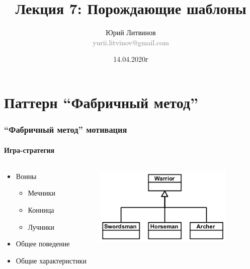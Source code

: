 \documentclass[xetex,mathserif,serif]{beamer}
\title[Шаблоны]{Лекция 7: Порождающие шаблоны}
\author[Юрий Литвинов]{Юрий Литвинов\\\small{\textcolor{gray}{yurii.litvinov@gmail.com}}}
\date{14.04.2020г}
\begin{document}
	\frame{\titlepage}

	\section{Паттерн ``Фабричный метод''}

	\begin{frame}
		\frametitle{``Фабричный метод'' мотивация}
		\framesubtitle{Игра-стратегия}
		\begin{columns}
			\begin{column}{0.5\textwidth}
				\begin{itemize}
					\item Воины
					\begin{itemize}
						\item Мечники
						\item Конница
						\item Лучники
					\end{itemize}
					\item Общее поведение
					\item Общие характеристики
				\end{itemize}
			\end{column}
			\begin{column}{0.5\textwidth}
				\begin{center}
					\includegraphics[width=0.8\textwidth]{warriors.png}
				\end{center}
			\end{column}
		\end{columns}
	\end{frame}
\end{document}
